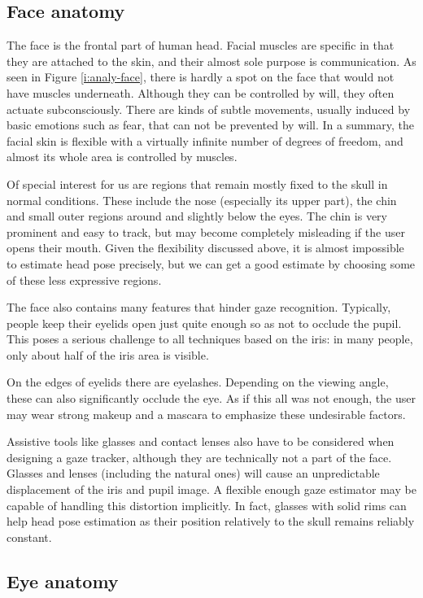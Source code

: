 \subsection{Face anatomy}
The face is the frontal part of human head.
Facial muscles are specific in that they are attached to the skin, and their almost sole purpose is communication.
As seen in Figure \ref{i:analy-face}, there is hardly a spot on the face that would not have muscles underneath.
Although they can be controlled by will, they often actuate subconsciously.
There are kinds of subtle movements, usually induced by basic emotions such as fear, that can not be prevented by will.
In a summary, the facial skin is flexible with a virtually infinite number of degrees of freedom, and almost its whole area is controlled by muscles.

Of special interest for us are regions that remain mostly fixed to the skull in normal conditions.
These include the nose (especially its upper part), the chin and small outer regions around and slightly below the eyes.
The chin is very prominent and easy to track, but may become completely misleading if the user opens their mouth.
Given the flexibility discussed above, it is almost impossible to estimate head pose precisely, but we can get a good estimate by choosing some of these less expressive regions.

The face also contains many features that hinder gaze recognition.
Typically, people keep their eyelids open just quite enough so as not to occlude the pupil.
This poses a serious challenge to all techniques based on the iris: in many people, only about half of the iris area is visible.

On the edges of eyelids there are eyelashes.
Depending on the viewing angle, these can also significantly occlude the eye.
As if this all was not enough, the user may wear strong makeup and a mascara to emphasize these undesirable factors.

Assistive tools like glasses and contact lenses also have to be considered when designing a gaze tracker, although they are technically not a part of the face.
Glasses and lenses (including the natural ones) will cause an unpredictable displacement of the iris and pupil image.
A flexible enough gaze estimator may be capable of handling this distortion implicitly.
In fact, glasses with solid rims can help head pose estimation as their position relatively to the skull remains reliably constant.

\subsection{Eye anatomy}
\label{s.eyeanatomy}

